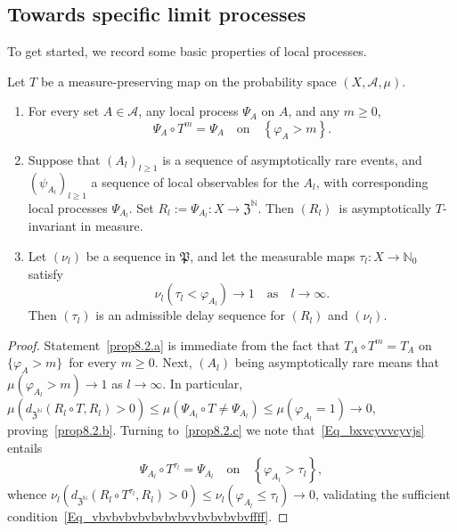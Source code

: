 \documentclass[AHL,Unicode,longabstracts]{cedram}
\newcommand{\clA}{\mathcal{A}}
\newcommand{\frkP}{\mathfrak{P}}
\newcommand{\frkZ}{\mathfrak{Z}}
\newcommand{\bbN}{\mathbb{N}}
\newcommand*{\alphenumi}{\renewcommand*{\theenumi}{\alph{enumi}}}
\begin{document}
\subsection{Towards specific limit processes}
To get started, we record some basic properties of local processes.

\begin{prop}\label{P_AsyInvarAdmissDelayInternal}
Let $T$ be a measure-preserving map on the probability space $(X,\clA,\mu)$.
\begin{enumerate}\alphenumi
\item\label{prop8.2.a} For every set $A\in\clA$, any local process $\Psi_{A}$ on $A$, and any $m\geq0$,
\begin{equation}\label{Eq_bxvcyvvcyvjs}
\Psi_{A}\circ T^{m}=\Psi_{A} \quad\text{on}\quad\left\{\varphi_{A}>m\right\}.
\end{equation}
\item\label{prop8.2.b} Suppose that $(A_{l})_{l\geq1}$ is a sequence of asymptotically rare events, and $(\psi_{A_{l}})_{l\geq1}$ a sequence of local observables for the $A_{l}$, with corresponding local processes $\Psi_{A_{l}}$. Set $R_{l}:=\Psi_{A_{l}}:X\rightarrow\frkZ^{\bbN}$. Then $(R_{l})$\emph{\ }is asymptotically $T$-invariant in measure.
\item\label{prop8.2.c} Let $(\nu_{l})$ be a sequence in $\frkP$, and let the measurable maps $\tau_{l}:X\rightarrow\bbN_{0}$ satisfy
\begin{equation}
\nu_{l}\left(\tau_{l}<\varphi_{A_{l}}\right) \longrightarrow1\quad\text{as}\quad l\rightarrow\infty.
\end{equation}
Then $(\tau_{l})$ is an admissible delay sequence for $(R_{l})$ and $(\nu _{l})$.
\end{enumerate}
\end{prop}

\begin{proof}
Statement~\eqref{prop8.2.a} is immediate from the fact that $T_{A}\circ T^{m}=T_{A}$ on $\{\varphi_{A}>m\}$\ for every $m\geq0$. Next, $(A_{l})$ being asymptotically rare means that $\mu(\varphi_{A_{l}}>m)\rightarrow1$ as $l\rightarrow\infty$. In particular, $\mu(d_{\frkZ^{\bbN}}(R_{l}\circ T,R_{l})>0)\leq\mu(\Psi_{A_{l}}\circ T\neq\Psi_{A_{l}})\leq\mu(\varphi_{A_{l} }=1)\rightarrow0$, proving~\eqref{prop8.2.b}. Turning to~\eqref{prop8.2.c} we note that~\eqref{Eq_bxvcyvvcyvjs} entails
\[
\Psi_{A_{l}}\circ T^{\tau_{l}}=\Psi_{A_{l}} \quad\text{on} \quad\left\{\varphi_{A_{l}}>\tau_{l}\right\},
\]
whence $\nu_{l}(d_{\frkZ^{\bbN}}(R_{l}\circ T^{\tau_{l}},R_{l})>0)\leq\nu_{l}(\varphi_{A_{l}}\leq\tau_{l})\rightarrow0$, validating the sufficient condition~\eqref{Eq_vbvbvbvbvbvbvbvvbvbvbvbvffff}.
\end{proof}
\end{document}
